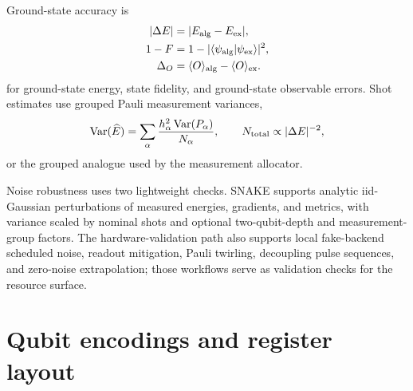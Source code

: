 \documentclass[
  reprint,
  amsmath,
  amssymb,
  aps,
  pra,
  nofootinbib,
  superscriptaddress,
  floatfix
]{revtex4-2}
\newcommand{\ex}{\mathrm{ex}}
\newcommand{\Var}{\operatorname{Var}}
\newcommand{\braket}[2]{\langle #1|#2\rangle}
\newcommand{\expval}[1]{\langle #1\rangle}
\begin{document}
Ground-state accuracy is
\begin{equation}
\begin{aligned}
|\Delta E|&=|E_{\rm alg}-E_{\ex}|,\\
1-F&=1-|\braket{\psi_{\rm alg}}{\psi_{\ex}}|^2,\\
\Delta_O&=\expval{O}_{\rm alg}-\expval{O}_{\ex}.
\end{aligned}
\label{eq:appendix_static_metrics}
\end{equation}
for ground-state energy, state fidelity, and ground-state observable errors. Shot estimates use grouped Pauli measurement variances,
\begin{equation}
\Var(\widehat E)=\sum_{\alpha}\frac{h_{\alpha}^2\Var(P_{\alpha})}{N_{\alpha}},
\qquad
N_{\rm total}\propto |\Delta E|^{-2},
\label{eq:appendix_shot_estimate}
\end{equation}
or the grouped analogue used by the measurement allocator.

Noise robustness uses two lightweight checks. SNAKE supports analytic iid-Gaussian perturbations of measured energies, gradients, and metrics, with variance scaled by nominal shots and optional two-qubit-depth and measurement-group factors. The hardware-validation path also supports local fake-backend scheduled noise, readout mitigation, Pauli twirling, decoupling pulse sequences, and zero-noise extrapolation; those workflows serve as validation checks for the resource surface.

\section{Qubit encodings and register layout}
\label{app:encodings}
\end{document}
